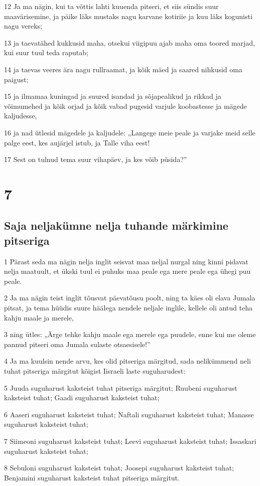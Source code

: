 \par 12 Ja ma nägin, kui ta võttis lahti kuuenda pitseri, et siis sündis suur maavärisemine, ja päike läks mustaks nagu karvane kotiriie ja kuu läks kogunisti nagu vereks;
\par 13 ja taevatähed kukkusid maha, otsekui viigipuu ajab maha oma toored marjad, kui suur tuul teda raputab;
\par 14 ja taevas veeres ära nagu rullraamat, ja kõik mäed ja saared nihkusid oma paigust;
\par 15 ja ilmamaa kuningad ja suured isandad ja sõjapealikud ja rikkad ja võimumehed ja kõik orjad ja kõik vabad pugesid varjule koobastesse ja mägede kaljudesse,
\par 16 ja nad ütlesid mägedele ja kaljudele: „Langege meie peale ja varjake meid selle palge eest, kes aujärjel istub, ja Talle viha eest!
\par 17 Sest on tulnud tema suur vihapäev, ja kes võib püsida?”


\chapter{7}

\section*{Saja neljakümne nelja tuhande märkimine pitseriga}

\par 1 Pärast seda ma nägin nelja inglit seisvat maa neljal nurgal ning kinni pidavat nelja maatuult, et ükski tuul ei puhuks maa peale ega mere peale ega ühegi puu peale.
\par 2 Ja ma nägin teist inglit tõusvat päevatõusu poolt, ning ta käes oli elava Jumala pitsat, ja tema hüüdis suure häälega nendele neljale inglile, kellele oli antud teha kahju maale ja merele,
\par 3 ning ütles: „Ärge tehke kahju maale ega merele ega puudele, enne kui me oleme pannud pitseri oma Jumala sulaste otsaesisele!”
\par 4 Ja ma kuulsin nende arvu, kes olid pitseriga märgitud, sada nelikümmend neli tuhat pitseriga märgitut kõigist Iisraeli laste suguharudest:
\par 5 Juuda suguharust kaksteist tuhat pitseriga märgitut; Ruubeni suguharust kaksteist tuhat; Gaadi suguharust kaksteist tuhat;
\par 6 Aaseri suguharust kaksteist tuhat; Naftali suguharust kaksteist tuhat; Manasse suguharust kaksteist tuhat;
\par 7 Siimeoni suguharust kaksteist tuhat; Leevi suguharust kaksteist tuhat; Issaskari suguharust kaksteist tuhat;
\par 8 Sebuloni suguharust kaksteist tuhat; Joosepi suguharust kaksteist tuhat; Benjamini suguharust kaksteist tuhat pitseriga märgitut.

